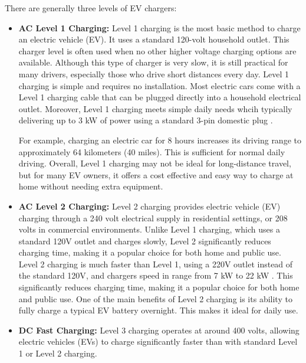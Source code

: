 There are generally three levels of EV chargers:
\begin{itemize}
    \item \textbf{AC Level 1 Charging:} Level 1 charging is the most basic method to charge an electric vehicle (EV). It uses a standard 120-volt household outlet. This charger level is often used when no other higher voltage charging options are available. Although this type of charger is very slow, it is still practical for many drivers, especially those who drive short distances every day. Level 1 charging is simple and requires no installation. Most electric cars come with a Level 1 charging cable that can be plugged directly into a household electrical outlet.
    Moreover, Level 1 charging meets simple daily needs whcih typically delivering up to 3 kW of power using a standard 3-pin domestic plug \cite{RAC}.   
    
    For example, charging an electric car for 8 hours increases its driving range to approximately 64 kilometers (40 miles). This is sufficient for normal daily driving. Overall, Level 1 charging may not be ideal for long-distance travel, but for many EV owners, it offers a cost effective and easy way to charge at home without needing extra equipment\cite{Alternative Fuels Data Center}.

    



        
    \item \textbf{AC Level 2 Charging:} Level 2 charging provides electric vehicle (EV) charging through a 240 volt electrical supply in residential settings, or 208 volts in commercial environments\cite{Alternative Fuels Data Center}. Unlike Level 1 charging, which uses a standard 120V outlet and charges slowly, Level 2 significantly reduces charging time, making it a popular choice for both home and public use. Level 2 charging is much faster than Level 1, using a 220V outlet instead of the standard 120V\cite{Alternative Fuels Data Center}, and chargers speed in range from 7 kW to 22 kW \cite{RAC}. This significantly reduces charging time, making it a popular choice for both home and public use. One of the main benefits of Level 2 charging is its ability to fully charge a typical EV battery overnight. This makes it ideal for daily use.


    
    \item \textbf{DC Fast Charging:} Level 3 charging operates at around 400 volts, allowing electric vehicles (EVs) to charge significantly faster than with standard Level 1 or Level 2 charging\cite{DC Fast Chargers for Electric Vehicles}.   
    

\end{itemize}
